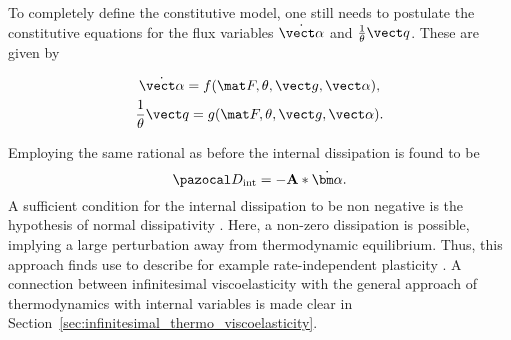 To completely define the constitutive model, one still needs to postulate the constitutive equations for the flux variables $\dot{\vect \alpha}$ and $\frac{1}{\theta}\vect q$.
These are given by
\begin{highlight}[innertopmargin=-5pt]
            \begin{gather}     \dot{\vect \alpha} = f(\mat F, \theta, \vect g, \vect \alpha),\\      \frac{1}{\theta}\vect q = g(\mat F, \theta, \vect g, \vect \alpha).
            \end{gather}
\end{highlight}

Employing the same rational as before the internal dissipation is found to be
\begin{equation}
  \pazocal D_\text{int} = -\mathbf A *\dot{\bm \alpha}.
\end{equation}
A sufficient condition for the internal dissipation to be non negative is the hypothesis of normal dissipativity \citep{desouzanetoComputationalMethodsPlasticity2008}.
Here, a non-zero dissipation is possible, implying a large perturbation away from thermodynamic equilibrium.
Thus, this approach finds use to describe for example rate-independent plasticity \citep{desouzanetoComputationalMethodsPlasticity2008}.
A connection between infinitesimal viscoelasticity with the general approach of thermodynamics with internal variables is made clear in Section~\ref{sec:infinitesimal_thermo_viscoelasticity}.

\newpage\null\thispagestyle{blank}\newpage
